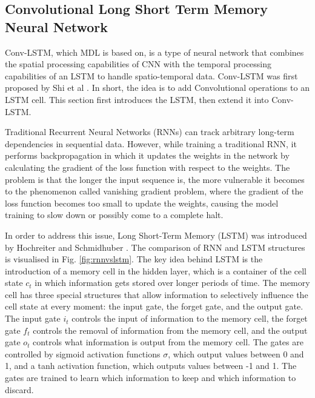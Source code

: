 \documentclass[11pt]{uonthesis}
\begin{document}
\subsection{Convolutional Long Short Term Memory Neural Network}
Conv-LSTM, which MDL is based on, is a type of neural network that combines the spatial processing capabilities of CNN with the temporal processing capabilities of an LSTM to handle spatio-temporal data. Conv-LSTM was first proposed by Shi et al \cite{convlstm}. In short, the idea is to add Convolutional operations to an LSTM cell. This section first introduces the LSTM, then extend it into Conv-LSTM.

Traditional Recurrent Neural Networks (RNNs) can track arbitrary long-term dependencies in sequential data. However, while training a traditional RNN, it performs backpropagation in which it updates the weights in the network by calculating the gradient of the loss function with respect to the weights. The problem is that the longer the input sequence is, the more vulnerable it becomes to the phenomenon called vanishing gradient problem, where the gradient of the loss function becomes too small to update the weights, causing the model training to slow down or possibly come to a complete halt. %

In order to address this issue, Long Short-Term Memory (LSTM) was introduced by Hochreiter and Schmidhuber \cite{lstm}. The comparison of RNN and LSTM structures is visualised in Fig. \ref{fig:rnnvslstm}. The key idea behind LSTM is the introduction of a memory cell in the hidden layer, which is a container of the cell state $c_t$ in which information gets stored over longer periods of time. The memory cell has three special structures that allow information to selectively influence the cell state at every moment: the input gate, the forget gate, and the output gate. The input gate $i_t$ controls the input of information to the memory cell, the forget gate $f_t$ controls the removal of information from the memory cell, and the output gate $o_t$ controls what information is output from the memory cell. The gates are controlled by sigmoid activation functions $\sigma$, which output values between 0 and 1, and a tanh activation function, which outputs values between -1 and 1. The gates are trained to learn which information to keep and which information to discard.
\end{document}
